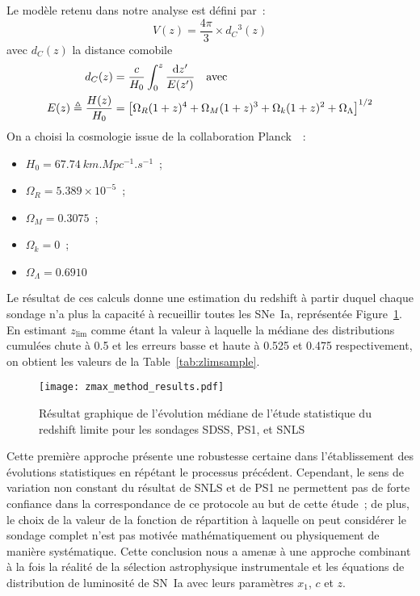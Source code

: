 \documentclass[../main/main.tex]{subfiles}
\begin{document}
Le modèle retenu dans notre analyse est défini par~:
\begin{equation}\label{eq:comobvol}
    V(z) = \frac{4\pi}{3}\times d_C{}^3(z)
\end{equation}
avec $d_C(z)$ la distance comobile
\begin{align}
    d_C(z)                           & =
    \frac{c}{H_0} \int_{0}^{z} \frac{\mathrm{d} z'}{E(z')}
    \quad\text{avec}\quad\\
    E(z) \triangleq \frac{H(z)}{H_0} & =
    \left[\Omega_R(1+z)^4 + \Omega_M(1+z)^3 +
        \Omega_k(1+z)^2 + \Omega_\Lambda
    \right]^{1/2}
\end{align}
On a choisi la cosmologie issue de la collaboration Planck~\citep{planck2018}~:
\begin{itemize}
    \item $H_0 = \SI{67.74}{km.Mpc^{-1}.s^{-1}}$~;
    \item $\Omega_R = 5.389\times10^{-5}$~;
    \item $\Omega_M = 0.3075$~;
    \item $\Omega_k = 0$~;
    \item $\Omega_\Lambda = 0.6910$
\end{itemize}

Le résultat de ces calculs donne une estimation du redshift à partir duquel
chaque sondage n'a plus la capacité à recueillir toutes les SNe~Ia, représentée
Figure~\ref{fig:zmax_method_results}. En estimant $z_{\lim}$ comme étant la
valeur à laquelle la médiane des distributions cumulées chute à 0.5 et les
erreurs basse et haute à 0.525 et 0.475 respectivement, on obtient les valeurs
de la Table~\ref{tab:zlimsample}.

\begin{figure}[h]
    \centering
    \texttt{[image: zmax\_method\_results.pdf]}
    \captionsetup{justification=centering}
    \caption{Résultat graphique de l'évolution médiane de l'étude statistique du
    redshift limite pour les sondages SDSS, PS1, et SNLS}
    \label{fig:zmax_method_results}
\end{figure}

Cette première approche présente une robustesse certaine dans l'établissement
des évolutions statistiques en répétant le processus précédent. Cependant, le
sens de variation non constant du résultat de SNLS et de PS1 ne permettent pas
de forte confiance dans la correspondance de ce protocole au but de cette
étude~; de plus, le choix de la valeur de la fonction de répartition à laquelle
on peut considérer le sondage complet n'est pas motivée mathématiquement ou
physiquement de manière systématique. Cette conclusion nous a amenæ à une
approche combinant à la fois la réalité de la sélection astrophysique
instrumentale et les équations de distribution de luminosité de SN~Ia avec leurs
paramètres $x_1$, $c$ et $z$.
\end{document}
